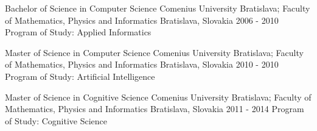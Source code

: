 

\begin{cventries}

  \cventry
    {Bachelor of Science in Computer Science} %
    {Comenius University Bratislava; Faculty of Mathematics, Physics and Informatics} %
    {Bratislava, Slovakia} %
    {2006 - 2010} %
    {Program of Study: Applied Informatics}

  \cventry
    {Master of Science in Computer Science} %
    {Comenius University Bratislava; Faculty of Mathematics, Physics and Informatics} %
    {Bratislava, Slovakia} %
    {2010 - 2010} %
    {Program of Study: Artificial Intelligence}

  \cventry
    {Master of Science in Cognitive Science} %
    {Comenius University Bratislava; Faculty of Mathematics, Physics and Informatics} %
    {Bratislava, Slovakia} %
    {2011 - 2014} %
    {Program of Study: Cognitive Science}

\end{cventries}
